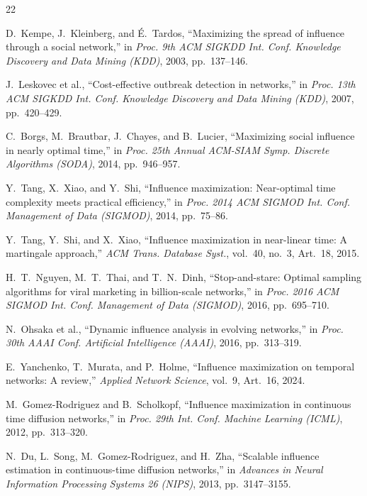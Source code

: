 \documentclass[10pt,conference]{IEEEtran}
\begin{document}
\begin{thebibliography}{22}

D.~Kempe, J.~Kleinberg, and \'{E}.~Tardos,
``Maximizing the spread of influence through a social network,''
in \textit{Proc. 9th ACM SIGKDD Int. Conf. Knowledge Discovery and Data Mining (KDD)}, 2003, pp.~137--146.

J.~Leskovec et al.,
``Cost-effective outbreak detection in networks,''
in \textit{Proc. 13th ACM SIGKDD Int. Conf. Knowledge Discovery and Data Mining (KDD)}, 2007, pp.~420--429.

C.~Borgs, M.~Brautbar, J.~Chayes, and B.~Lucier,
``Maximizing social influence in nearly optimal time,''
in \textit{Proc. 25th Annual ACM-SIAM Symp. Discrete Algorithms (SODA)}, 2014, pp.~946--957.

Y.~Tang, X.~Xiao, and Y.~Shi,
``Influence maximization: Near-optimal time complexity meets practical efficiency,''
in \textit{Proc. 2014 ACM SIGMOD Int. Conf. Management of Data (SIGMOD)}, 2014, pp.~75--86.

Y.~Tang, Y.~Shi, and X.~Xiao,
``Influence maximization in near-linear time: A martingale approach,''
\textit{ACM Trans. Database Syst.}, vol.~40, no.~3, Art.~18, 2015.

H.~T.~Nguyen, M.~T.~Thai, and T.~N.~Dinh,
``Stop-and-stare: Optimal sampling algorithms for viral marketing in billion-scale networks,''
in \textit{Proc. 2016 ACM SIGMOD Int. Conf. Management of Data (SIGMOD)}, 2016, pp.~695--710.

N.~Ohsaka et al.,
``Dynamic influence analysis in evolving networks,''
in \textit{Proc. 30th AAAI Conf. Artificial Intelligence (AAAI)}, 2016, pp.~313--319.

E.~Yanchenko, T.~Murata, and P.~Holme,
``Influence maximization on temporal networks: A review,''
\textit{Applied Network Science}, vol.~9, Art.~16, 2024.

M.~Gomez-Rodriguez and B.~Scholkopf,
``Influence maximization in continuous time diffusion networks,''
in \textit{Proc. 29th Int. Conf. Machine Learning (ICML)}, 2012, pp.~313--320.

N.~Du, L.~Song, M.~Gomez-Rodriguez, and H.~Zha,
``Scalable influence estimation in continuous-time diffusion networks,''
in \textit{Advances in Neural Information Processing Systems 26 (NIPS)}, 2013, pp.~3147--3155.


\end{thebibliography}
\end{document}
